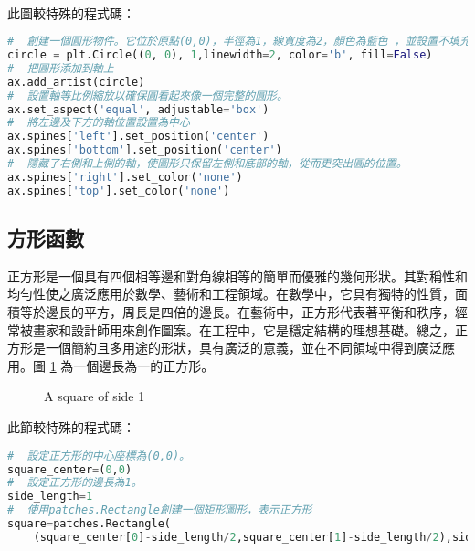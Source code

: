 \begin{enumerate}
\begin{figure}[h]
\end{figure}\\
此圖較特殊的程式碼：
\begin{lstlisting}[language=Python]
#  創建一個圓形物件。它位於原點(0,0)，半徑為1，線寬度為2，顏色為藍色 ，並設置不填充內部(fill=False)。
circle = plt.Circle((0, 0), 1,linewidth=2, color='b', fill=False)
#  把圓形添加到軸上
ax.add_artist(circle)
#  設置軸等比例縮放以確保圓看起來像一個完整的圓形。
ax.set_aspect('equal', adjustable='box')
#  將左邊及下方的軸位置設置為中心
ax.spines['left'].set_position('center')
ax.spines['bottom'].set_position('center')
#  隱藏了右側和上側的軸，使圖形只保留左側和底部的軸，從而更突出圓的位置。
ax.spines['right'].set_color('none')
ax.spines['top'].set_color('none')
\end{lstlisting}
\end{enumerate}
\subsection{方形函數}
正方形是一個具有四個相等邊和對角線相等的簡單而優雅的幾何形狀。其對稱性和均勻性使之廣泛應用於數學、藝術和工程領域。在數學中，它具有獨特的性質，面積等於邊長的平方，周長是四倍的邊長。在藝術中，正方形代表著平衡和秩序，經常被畫家和設計師用來創作圖案。在工程中，它是穩定結構的理想基礎。總之，正方形是一個簡約且多用途的形狀，具有廣泛的意義，並在不同領域中得到廣泛應用。圖 \ref{fig:square} 為一個邊長為一的正方形。
\begin{figure}[h]
    \caption{A square of side 1}
    \label{fig:square}
\end{figure}
此節較特殊的程式碼：
\begin{lstlisting}[language=Python]
#  設定正方形的中心座標為(0,0)。
square_center=(0,0)  
#  設定正方形的邊長為1。
side_length=1
#  使用patches.Rectangle創建一個矩形圖形，表示正方形
square=patches.Rectangle(
    (square_center[0]-side_length/2,square_center[1]-side_length/2),side_length,side_length,linewidth=2,edgecolor='b',facecolor='none')
\end{lstlisting}
